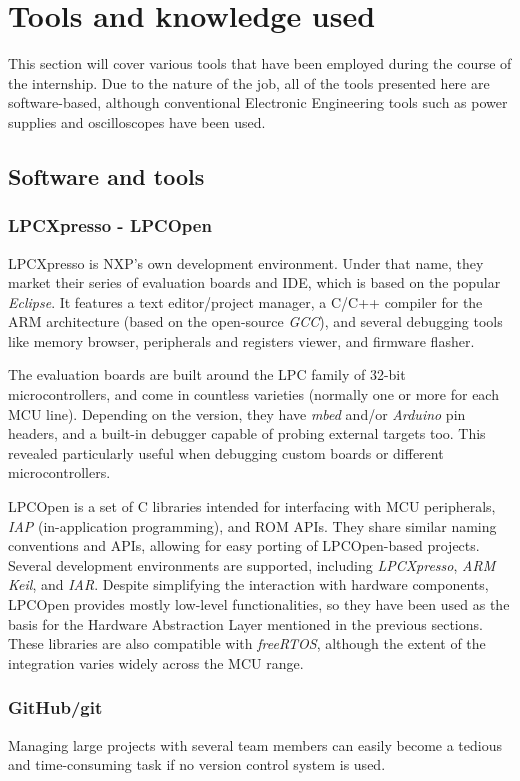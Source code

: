 \section{Tools and knowledge used}
This section will cover various tools that have been employed during the course of the internship.
Due to the nature of the job, all of the tools presented here are software-based, although conventional Electronic Engineering tools such as power supplies and oscilloscopes have been used.

\subsection{Software and tools}

\subsubsection{LPCXpresso - LPCOpen}
LPCXpresso is NXP's own development environment.
Under that name, they market their series of evaluation boards and IDE, which is based on the popular \emph{Eclipse}.
It features a text editor/project manager, a C/C++ compiler for the ARM architecture (based on the open-source \emph{GCC}), and several debugging tools like memory browser, peripherals and registers viewer, and firmware flasher.

The evaluation boards are built around the LPC family of 32-bit microcontrollers, and come in countless varieties (normally one or more for each MCU line).
Depending on the version, they have \emph{mbed} and/or \emph{Arduino} pin headers, and a built-in debugger capable of probing external targets too.
This revealed particularly useful when debugging custom boards or different microcontrollers.

LPCOpen is a set of C libraries intended for interfacing with MCU peripherals, \emph{IAP} (in-application programming), and ROM APIs.
They share similar naming conventions and APIs, allowing for easy porting of LPCOpen-based projects.
Several development environments are supported, including \emph{LPCXpresso}, \emph{ARM Keil}, and \emph{IAR}.
Despite simplifying the interaction with hardware components, LPCOpen provides mostly low-level functionalities, so they have been used as the basis for the Hardware Abstraction Layer mentioned in the previous sections.
These libraries are also compatible with \emph{freeRTOS}, although the extent of the integration varies widely across the MCU range.


\subsubsection{GitHub/git}
Managing large projects with several team members can easily become a tedious and time-consuming task if no version control system is used.

